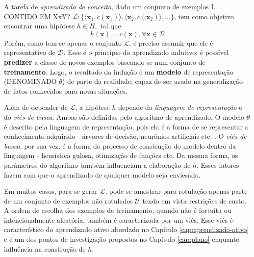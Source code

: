 A tarefa de \textit{aprendizado de conceito}, dado um conjunto de exemplos L CONTIDO EM XxY? $\mathcal{L}:\{\langle \bm{x}_1, c(\bm{x}_1) \rangle, \langle \bm{x}_2, c(\bm{x}_2) \rangle, ... \}$, tem como objetivo encontrar uma hipótese $h \in H,$ tal que
\begin{equation}
 h(\bm{x}) = c(\bm{x}), \forall \bm{x} \in \mathcal{D}
\end{equation}
Porém, como tem-se apenas o conjunto $\mathcal{L}$, é preciso assumir que ele é representativo de $\mathcal{D}$.
Esse é o princípio do aprendizado indutivo: é possível \textbf{predizer} a classe de novos exemplos baseando-se num conjunto de \textbf{treinamento}.
Logo, o resultado da indução é um \textbf{modelo} de representação (DENOMINADO $\theta$) de parte da realidade; capaz de ser usado na generalização de fatos conhecidos para novas situações.

Além de depender de $\mathcal{L}$, a hipótese $h$ depende da \textit{linguagem de representação} e
do \textit{viés de busca}.
Ambas são definidas pelo algoritmo de aprendizado.
O modelo $\theta$ é descrito pela linguagem de representação,
pois ela é a forma de se representar o conhecimento adquirido -
árvores de decisão, neurônios artificiais etc. \citep{quinlan1993c4,haykin1994neural}.
O \textit{viés de busca}, por sua vez, é a forma do processo de construção do modelo dentro da linguagem -
heurística gulosa, otimização de funções etc.
Da mesma forma, os parâmetros do algoritmo também influenciam a elaboração de $h$.
Esses fatores fazem com que o aprendizado de qualquer modelo seja enviesado.

Em muitos casos, para se gerar $\mathcal{L}$, pode-se amostrar para rotulação apenas
parte de um conjunto de exemplos não rotulados $\mathcal{U}$ tendo em vista
restrições de custo.
A ordem de escolha dos exemplos de treinamento, quando não é fortuita ou
intencionalmente aleatória, também é caracterizada por um viés.
Esse viés é característico do aprendizado ativo abordado no
Capítulo \ref{cap:aprendizado-ativo} e é um dos pontos de investigação propostos
no Capítulo \ref{cap:plano} enquanto influência na construção de $h$.


%
%
